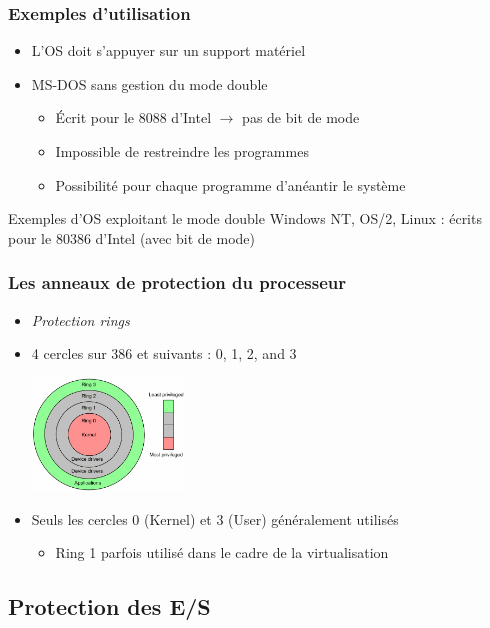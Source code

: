 \begin{frame}
 \frametitle{Exemples d’utilisation}
 \begin{itemize}
 \item L'OS doit s'appuyer sur un support matériel
 \item MS-DOS sans gestion du mode double 
\begin{itemize}
\item Écrit pour le 8088 d’Intel $\rightarrow$ pas de bit de mode
\item Impossible de restreindre les programmes
\item Possibilité pour chaque programme d’anéantir le système
\end{itemize}
\end{itemize}

\begin{exampleblock}{Exemples d'OS exploitant le mode double}
Windows NT, OS/2, Linux : écrits pour le 80386 d’Intel (avec bit de mode)
\end{exampleblock}
\end{frame}

\begin{frame}
\frametitle{Les anneaux de protection du processeur}
\begin{itemize}
\item \textit{Protection rings}
\item 4 cercles sur 386 et suivants : 0, 1, 2, and 3

  \includegraphics[height=3cm]{../illustration/cpu-ring-model.png}

\item Seuls les cercles 0 (Kernel) et 3 (User) généralement utilisés
\begin{itemize}
\item Ring 1 parfois utilisé dans le cadre de la virtualisation
\end{itemize}
\end{itemize}
\end{frame}

\subsection{Protection des E/S}

